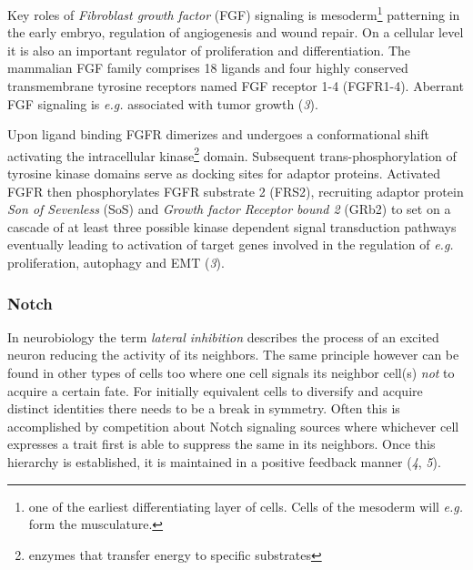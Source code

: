 \documentclass[10pt, b5paper, singlespacinge, twoside]{reedthesis} %
\theoremstyle{definition}
\theoremstyle{definition}
\theoremstyle{definition}
\theoremstyle{remark}
\begin{document}
Key roles of \emph{Fibroblast growth factor} (FGF) signaling is mesoderm\footnote{one of the earliest differentiating layer of cells. Cells of the mesoderm will \emph{e.g.} form the musculature.} patterning in the early embryo, regulation of angiogenesis and wound repair. On a cellular level it is also an important regulator of proliferation and differentiation. The mammalian FGF family comprises 18 ligands and four highly conserved transmembrane tyrosine receptors named FGF receptor 1-4 (FGFR1-4). Aberrant FGF signaling is \emph{e.g.} associated with tumor growth (\emph{3}).

Upon ligand binding FGFR dimerizes and undergoes a conformational shift activating the intracellular kinase\footnote{enzymes that transfer energy to specific substrates} domain. Subsequent trans-phosphorylation of tyrosine kinase domains serve as docking sites for adaptor proteins. Activated FGFR then phosphorylates FGFR substrate 2 (FRS2), recruiting adaptor protein \emph{Son of Sevenless} (SoS) and \emph{Growth factor Receptor bound 2} (GRb2) to set on a cascade of at least three possible kinase dependent signal transduction pathways eventually leading to activation of target genes involved in the regulation of \emph{e.g.} proliferation, autophagy and EMT (\emph{3}).

\hypertarget{intro-notch}{%
\subsubsection{Notch}\label{intro-notch}}

In neurobiology the term \emph{lateral inhibition} describes the process of an excited neuron reducing the activity of its neighbors. The same principle however can be found in other types of cells too where one cell signals its neighbor cell(s) \emph{not} to acquire a certain fate. For initially equivalent cells to diversify and acquire distinct identities there needs to be a break in symmetry. Often this is accomplished by competition about Notch signaling sources where whichever cell expresses a trait first is able to suppress the same in its neighbors. Once this hierarchy is established, it is maintained in a positive feedback manner (\emph{4}, \emph{5}).
\end{document}
